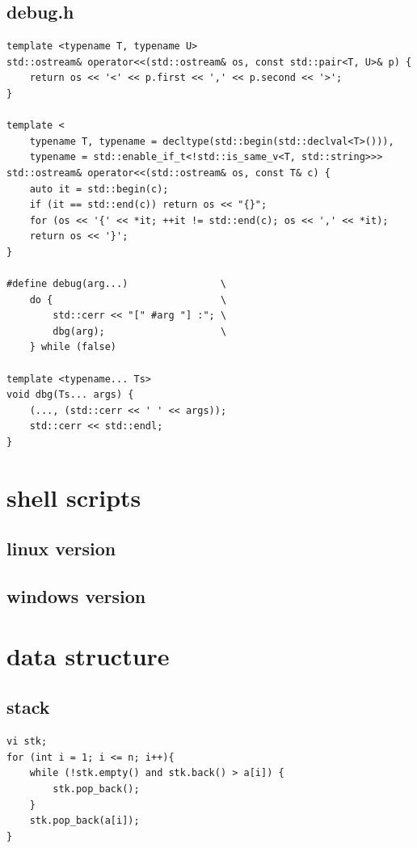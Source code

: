 \documentclass[UTF8, a4paper, titlepage, twoside]{ctexart}
\begin{document}
\subsection{ debug.h }
\begin{lstlisting}[style=cpp]
template <typename T, typename U>
std::ostream& operator<<(std::ostream& os, const std::pair<T, U>& p) {
    return os << '<' << p.first << ',' << p.second << '>';
}

template <
    typename T, typename = decltype(std::begin(std::declval<T>())),
    typename = std::enable_if_t<!std::is_same_v<T, std::string>>>
std::ostream& operator<<(std::ostream& os, const T& c) {
    auto it = std::begin(c);
    if (it == std::end(c)) return os << "{}";
    for (os << '{' << *it; ++it != std::end(c); os << ',' << *it);
    return os << '}';
}

#define debug(arg...)                \
    do {                             \
        std::cerr << "[" #arg "] :"; \
        dbg(arg);                    \
    } while (false)

template <typename... Ts>
void dbg(Ts... args) {
    (..., (std::cerr << ' ' << args));
    std::cerr << std::endl;
}    
\end{lstlisting}

\newpage
\section{ shell scripts }
\subsection{ linux version }


\subsection{ windows version }


\newpage
\section{ data structure }

\subsection{ stack }
\begin{lstlisting}[style=cpp]
vi stk;
for (int i = 1; i <= n; i++){
    while (!stk.empty() and stk.back() > a[i]) {
        stk.pop_back();
    }
    stk.pop_back(a[i]);
}
\end{lstlisting}
\end{document}
